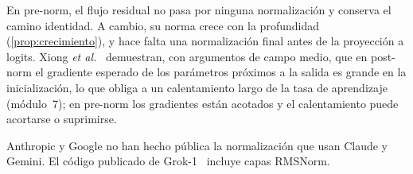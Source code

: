 En pre-norm, el flujo residual no pasa por ninguna normalización y conserva el camino identidad. A cambio, su norma crece con la profundidad (\cref{prop:crecimiento}), y hace falta una normalización final antes de la proyección a logits. Xiong \emph{et al.}~\cite{xiong} demuestran, con argumentos de campo medio, que en post-norm el gradiente esperado de los parámetros próximos a la salida es grande en la inicialización, lo que obliga a un calentamiento largo de la tasa de aprendizaje (módulo~7); en pre-norm los gradientes están acotados y el calentamiento puede acortarse o suprimirse.

\addtocounter{figure}{1}%

\begin{observacion}
Anthropic y Google no han hecho pública la normalización que usan Claude y Gemini. El código publicado de Grok-1~\cite{grok1} incluye capas RMSNorm.
\end{observacion}

